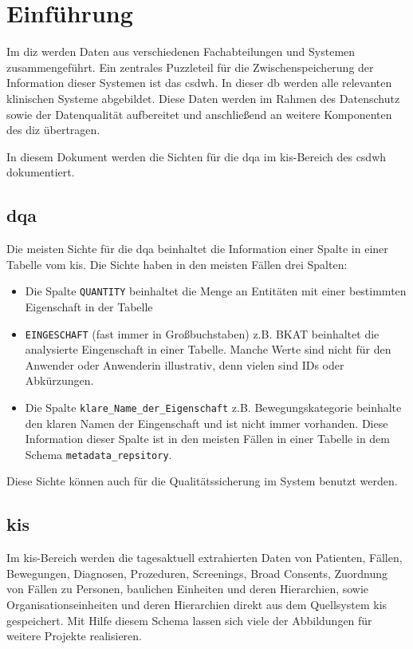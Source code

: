 \chapter{Einführung} \label{chp:intro}

Im \ac{diz} werden Daten aus verschiedenen Fachabteilungen und Systemen zusammengeführt. Ein zentrales Puzzleteil für die Zwischenspeicherung der Information dieser Systemen ist das \acf{csdwh}. In dieser \ac{db} werden alle relevanten klinischen Systeme abgebildet. Diese Daten werden im Rahmen des Datenschutz sowie der Datenqualität aufbereitet und anschließend an weitere Komponenten des \ac{diz} übertragen.

In diesem Dokument werden die Sichten für die \ac{dqa} im \ac{kis}-Bereich des \ac{csdwh} dokumentiert.

\section{\acs{dqa}}
Die meisten Sichte für die \ac{dqa} beinhaltet die Information einer Spalte in einer Tabelle vom \ac{kis}. Die Sichte haben in den meisten Fällen drei Spalten:

\begin{itemize}
	\item Die Spalte \texttt{QUANTITY} beinhaltet die Menge an Entitäten mit einer bestimmten Eigenschaft in der Tabelle
	\item \texttt{EINGESCHAFT} (fast immer in Großbuchstaben) z.B. BKAT beinhaltet die analysierte Eingenschaft in einer Tabelle. Manche Werte sind nicht für den Anwender oder Anwenderin illustrativ, denn vielen sind IDs oder Abkürzungen.
	\item Die Spalte \texttt{klare\_Name\_der\_Eigenschaft} z.B. Bewegungskategorie beinhalte den klaren Namen der Eingenschaft und ist nicht immer vorhanden. Diese Information dieser Spalte ist in den meisten Fällen in einer Tabelle in dem Schema \texttt{metadata\_repsitory}.
\end{itemize}

Diese Sichte können auch für die Qualitätssicherung im System benutzt werden.

\section{\acs{kis}}

 Im \ac{kis}-Bereich werden die tagesaktuell extrahierten Daten von Patienten, Fällen, Bewegungen, Diagnosen, Prozeduren, Screenings, Broad Consents, Zuordnung von Fällen zu Personen, baulichen Einheiten und deren Hierarchien, sowie Organisationseinheiten und deren Hierarchien direkt aus dem Quellsystem \ac{kis} gespeichert. Mit Hilfe diesem Schema lassen sich viele der Abbildungen für weitere Projekte realisieren.
 
